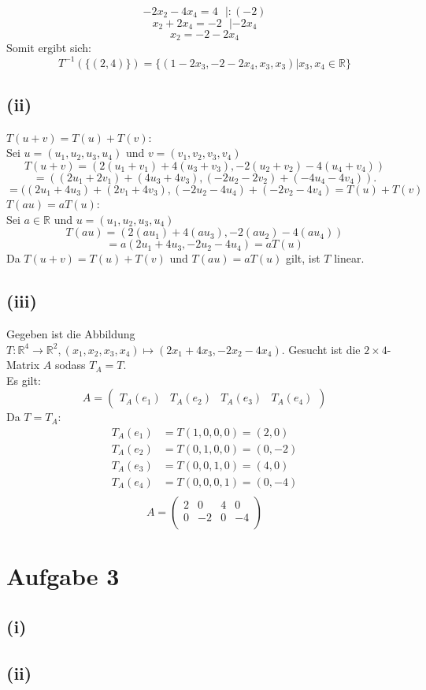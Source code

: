\documentclass{article}
\begin{document}
\[-2x_2-4x_4=4\ \ \ |:(-2)\]
\[x_2+2x_4 = -2\ \ \ |-2x_4\]
\[x_2= -2-2x_4\]
Somit ergibt sich:
\[T^{-1}(\{(2,4)\})=\{(1-2x_3,-2-2x_4,x_3,x_3)|x_3,x_4\in \mathbb{R}\}\]

\subsection{(ii)}
\(T(u+v)=T(u)+T(v)\):\\
Sei $u=(u_1,u_2,u_3,u_4)$ und $v=(v_1,v_2,v_3,v_4)$
\[T(u+v)=(2(u_1+v_1)+4(u_3+v_3),-2(u_2+v_2)-4(u_4+v_4)) \]
\[=((2u_1 + 2v_1) + (4u_3 + 4v_3), (-2u_2 - 2v_2) + (-4u_4 - 4v_4)).\]
\[=( (2u_1 + 4u_3) + (2v_1 + 4v_3), (-2u_2 - 4u_4) + (-2v_2 - 4v_4)=T(u)+T(v)\]
\newline
\(T(au)=aT(u)\): \\
Sei \(a \in \mathbb{R}\) und \(u=(u_1,u_2,u_3,u_4)\)
\[T(au)=(2(au_1)+4(au_3),-2(au_2)-4(au_4))\]
\[=a(2u_1+4u_3,-2u_2-4u_4) = aT(u)\]
\newline
Da $T(u+v)=T(u)+T(v)$ und $T(au)=aT(u)$ gilt, ist $T$ linear.

\subsection{(iii)}
Gegeben ist die Abbildung $T: \mathbb{R}^4 \to \mathbb{R}^2, (x_1, x_2, x_3, x_4) \mapsto (2x_1 + 4x_3, -2x_2 - 4x_4)$.
Gesucht ist die $2 \times 4$-Matrix $A$ sodass $T_A = T$. \\
Es gilt: \[A = \left(\begin{matrix}
    T_A(e_1) & T_A(e_2) & T_A(e_3) & T_A(e_4)
\end{matrix}\right)\]
Da $T = T_A$:
\begin{align*}
    T_A(e_1) &= T(1, 0, 0 ,0) = (2, 0) \\
    T_A(e_2) &= T(0, 1, 0 ,0) = (0, -2) \\
    T_A(e_3) &= T(0, 0, 1 ,0) = (4, 0) \\
    T_A(e_4) &= T(0, 0, 0 ,1) = (0, -4) \\
\end{align*}
\[A = \left(\begin{matrix}
    2 & 0 & 4  & 0 \\
    0 & -2 & 0 & -4 \\
\end{matrix}\right)\]

\section{Aufgabe 3}
\subsection{(i)}
\subsection{(ii)}
\end{document}

